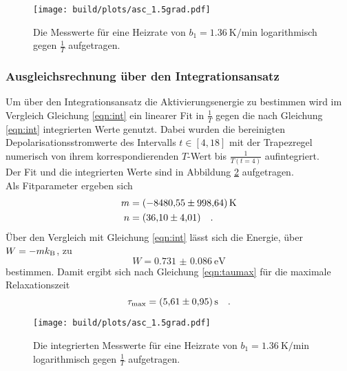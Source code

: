 \begin{figure}[ht]
  \centering
  \texttt{[image: build/plots/asc\_1.5grad.pdf]}
  \caption{Die Messwerte für eine Heizrate von $b_1 = \SI{1.36}{\kelvin\per\minute}$ 
          logarithmisch gegen $\frac{1}{T}$ aufgetragen.}
  \label{img:pol15}
\end{figure}



\subsubsection{Ausgleichsrechnung über den Integrationsansatz}
\label{sec:int}

\noindent 
Um über den Integrationsansatz die Aktivierungsenergie zu bestimmen wird im Vergleich Gleichung \ref{eqn:int} ein linearer Fit in 
$\frac{1}{T}$ gegen die nach Gleichung \ref{eqn:int} integrierten Werte genutzt. Dabei wurden die bereinigten Depolarisationsstromwerte
des Intervalls $t \in [4,18]$  mit der Trapezregel numerisch von ihrem korrespondierenden $T$-Wert bis $\frac{1}{T(t = 4)}$ aufintegriert.\\
Der Fit und die integrierten Werte sind in Abbildung \ref{img:int15} aufgetragen.\\
Als Fitparameter ergeben sich 
\begin{align*}
  m & = \SI{ -8480.55(99864)}{\kelvin}\\
  n & = \SI{36.10 (401)}{} \quad .
\end{align*}
Über den Vergleich mit Gleichung \ref{eqn:int} lässt sich die Energie, über $W = -m k_\t{B}$, zu 
\begin{equation*}
  W = \SI{0.731(0086)}{\electronvolt}
\end{equation*}
bestimmen. Damit ergibt sich nach Gleichung \ref{eqn:taumax} für die maximale Relaxationszeit 
\begin{equation*}
  \tau_\t{max} = \SI{5.61 (095)}{\second} \quad .
\end{equation*}

\begin{figure}[ht]
  \centering
  \texttt{[image: build/plots/asc\_1.5grad.pdf]}
  \caption{Die integrierten Messwerte für eine Heizrate von $b_1 = \SI{1.36}{\kelvin\per\minute}$ 
          logarithmisch gegen $\frac{1}{T}$ aufgetragen.}
  \label{img:int15}
\end{figure}

